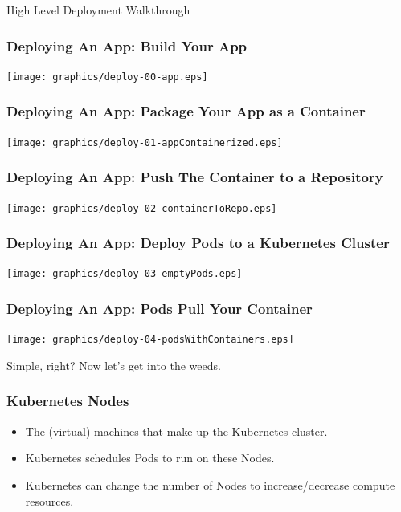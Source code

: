     \begin{frame}
        \begin{center}
            \Huge High Level Deployment Walkthrough
        \end{center}
    \end{frame}

    \begin{frame}
        \frametitle{Deploying An App: Build Your App}
        \texttt{[image: graphics/deploy-00-app.eps]}
    \end{frame}

    \begin{frame}
        \frametitle{Deploying An App: Package Your App as a Container}
        \texttt{[image: graphics/deploy-01-appContainerized.eps]}
    \end{frame}

    \begin{frame}
        \frametitle{Deploying An App: Push The Container to a Repository}
        \texttt{[image: graphics/deploy-02-containerToRepo.eps]}
    \end{frame}

    \begin{frame}
        \frametitle{Deploying An App: Deploy Pods to a Kubernetes Cluster}
        \texttt{[image: graphics/deploy-03-emptyPods.eps]}
    \end{frame}

    \begin{frame}
        \frametitle{Deploying An App: Pods Pull Your Container}
        \texttt{[image: graphics/deploy-04-podsWithContainers.eps]}
    \end{frame}

    \begin{frame}
        \begin{center}
            \Huge Simple, right? Now let's get into the weeds.
        \end{center}
    \end{frame}

    \begin{frame}
        \frametitle{Kubernetes Nodes}
        \begin{itemize}
            \item The (virtual) machines that make up the Kubernetes cluster.\pause
            \item Kubernetes schedules Pods to run on these Nodes.\pause
            \item Kubernetes can change the number of Nodes to increase/decrease compute resources.
        \end{itemize}
    \end{frame}

